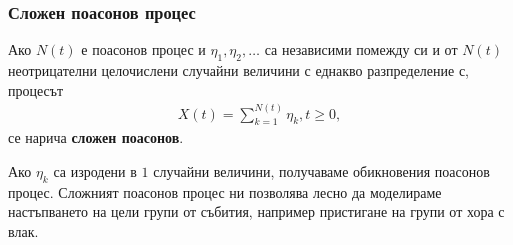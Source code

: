 \documentclass[numbers=endperiod, bibliography=totocnumbered]{scrartcl}
\begin{document}
\subsubsection{Сложен поасонов процес}

\begin{definition}
  Ако \( N(t) \) е поасонов процес и \( \eta_1, \eta_2, \ldots \) са независими помежду си и от \( N(t) \) неотрицателни целочислени случайни величини с еднакво разпределение с, процесът
  \begin{align*}
    X(t) = \sum_{k=1}^{N(t)} \eta_k, t \geq 0,
  \end{align*}
  се нарича \textbf{сложен поасонов}.
\end{definition}

\begin{note}
  Ако \( \eta_k \) са изродени в \( 1 \) случайни величини, получаваме обикновения поасонов процес. Сложният поасонов процес ни позволява лесно да моделираме настъпването на цели групи от събития, например пристигане на групи от хора с влак.
\end{note}
\end{document}
